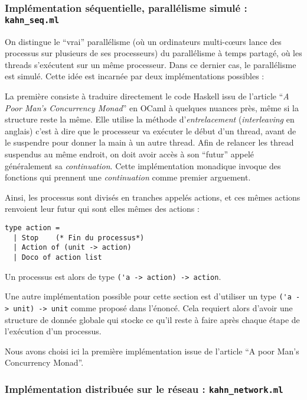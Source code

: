 \documentclass[]{scrartcl}
\begin{document}
\subsubsection{Implémentation séquentielle, parallélisme simulé :
\lstinline!kahn_seq.ml!}\label{impluxe9mentation-suxe9quentielle-paralluxe9lisme-simuluxe9-kahnux5fseq.ml}

On distingue le \enquote{vrai} parallélisme (où un ordinateurs
multi-cœurs lance des processus sur plusieurs de ses processeurs) du
parallélisme à temps partagé, où les threads s'exécutent sur un même
processeur. Dans ce dernier cas, le parallélisme est simulé. Cette idée
est incarnée par deux implémentations possibles :

La première consiste à traduire directement le code Haskell issu de
l'article \enquote{\emph{A Poor Man's Concurrency Monad}} en OCaml à
quelques nuances près, même si la structure reste la même. Elle utilise
la méthode d'\emph{entrelacement} (\emph{interleaving} en anglais) c'est
à dire que le processeur va exécuter le début d'un thread, avant de le
suspendre pour donner la main à un autre thread. Afin de relancer les
thread suspendus au même endroit, on doit avoir accès à son
\enquote{futur} appelé généralement sa \emph{continuation}. Cette
implémentation monadique invoque des fonctions qui prennent une
\emph{continuation} comme premier arguement.

Ainsi, les processus sont divisés en tranches appelés actions, et ces
mêmes actions renvoient leur futur qui sont elles mêmes des actions :

\begin{lstlisting}
type action =
  | Stop    (* Fin du processus*)
  | Action of (unit -> action)
  | Doco of action list
\end{lstlisting}

Un processus est alors de type \lstinline!('a -> action) -> action!.

Une autre implémentation possible pour cette section est d'utiliser un
type \lstinline!('a -> unit) -> unit! comme proposé dans l'énoncé. Cela
requiert alors d'avoir une structure de donnée globale qui stocke ce
qu'il reste à faire après chaque étape de l'exécution d'un processus.

Nous avons choisi ici la première implémentation issue de l'article
\enquote{A poor Man's Concurrency Monad}.

\subsubsection{Implémentation distribuée sur le réseau :
\lstinline!kahn_network.ml!}\label{impluxe9mentation-distribuuxe9e-sur-le-ruxe9seau-kahnux5fnetwork.ml}
\end{document}

